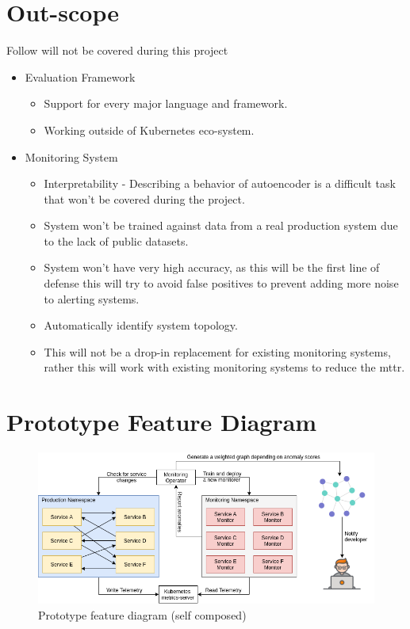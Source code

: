 


\section{Out-scope} \label{sec:out-scope}
Follow will not be covered during this project
\begin{itemize}[noitemsep,nolistsep] 
    \item Evaluation Framework
    \begin{itemize}[noitemsep,nolistsep] 
        \item Support for every major language and framework.
        \item Working outside of Kubernetes eco-system.
    \end{itemize}
    \item Monitoring System
    \begin{itemize}[noitemsep,nolistsep] 
        \item Interpretability - Describing a behavior of autoencoder is a difficult task that won't be covered during the project.
        \item System won't be trained against data from a real production system due to the lack of public datasets.
        \item System won't have very high accuracy, as this will be the first line of defense this will try to avoid false positives to prevent adding more noise to alerting systems.
        \item Automatically identify system topology.
        \item This will not be a drop-in replacement for existing monitoring systems, rather this will work with existing monitoring systems to reduce the \ac{mttr}.
    \end{itemize}
\end{itemize}

\section{Prototype Feature Diagram}
\begin{figure}[H]
    \centering
    \includegraphics[width=16cm]{assets/High-level-system-diagram.png}
    \caption{Prototype feature diagram (self composed)}
    \label{fig:high-level-diagram}
\end{figure}